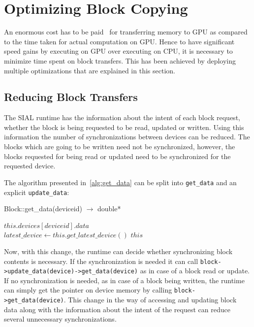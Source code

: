 \section{Optimizing Block Copying}
An enormous cost has to be paid~\cite{Bakkum2010}\cite{memorytransferoverhead}
for transferring memory to GPU as compared to the time taken for actual computation
on GPU. Hence to have significant speed gains by executing on GPU over executing
on CPU, it is necessary to minimize time spent on block transfers. This has been
achieved by deploying multiple optimizations that are explained in this section.

\subsection{Reducing Block Transfers}
The SIAL runtime has the information about the intent of each block request, whether
the block is being requested to be read, updated or written. Using this information the
number of synchronizations between devices can be reduced. The blocks which are
going to be written need not be synchronized, however, the blocks requested for
being read or updated need to be synchronized for the requested device.

The algorithm presented in~\ref{alg:get_data} can be split into
\texttt{get\_data} and an explicit \texttt{update\_data}:

\begin{algorithm}  {Block::get\_data(deviceid) $\rightarrow$ double*}
  \singlespacing

  \begin{algorithmic}[1]
    \State \Return $this.devices[deviceid].data$
    \EndFunction
    \\
    \State $latest\_device \gets this.get\_latest\_device()$
    \EndIf
    \State \Return $this$
    \EndFunction
  \end{algorithmic}
\end{algorithm}

Now, with this change, the runtime can decide whether synchronizing block contents
is necessary. If the synchronization is needed it can call
\texttt{block->update\_data(device)->get\_data(device)}
as in case of a block read or update. If no synchronization is needed, as in case
of a block being written, the runtime can simply get the pointer on device memory by calling
\texttt{block->get\_data(device)}.
This change in the way of accessing and updating block data along with the information
about the intent of the request can reduce several unnecessary synchronizations.

